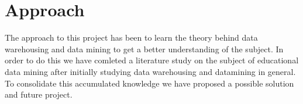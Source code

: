 \section{Approach}
The approach to this project has been to learn the theory behind data warehousing and data mining to get a better understanding of the subject.
In order to do this we have comleted a literature study on the subject of educational data mining after initially studying data warehousing and datamining in general.
To consolidate this accumulated knowledge we have proposed a possible solution and future project.
